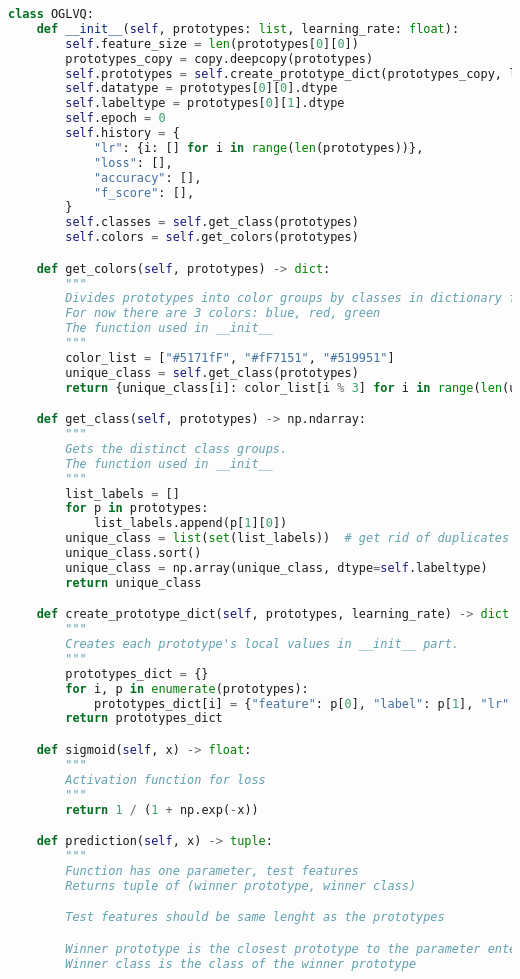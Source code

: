 \begin{lstlisting}[language = python]
class OGLVQ:
    def __init__(self, prototypes: list, learning_rate: float):
        self.feature_size = len(prototypes[0][0])
        prototypes_copy = copy.deepcopy(prototypes)
        self.prototypes = self.create_prototype_dict(prototypes_copy, learning_rate)
        self.datatype = prototypes[0][0].dtype
        self.labeltype = prototypes[0][1].dtype
        self.epoch = 0
        self.history = {
            "lr": {i: [] for i in range(len(prototypes))},
            "loss": [],
            "accuracy": [],
            "f_score": [],
        }
        self.classes = self.get_class(prototypes)
        self.colors = self.get_colors(prototypes)

    def get_colors(self, prototypes) -> dict:
        """
        Divides prototypes into color groups by classes in dictionary form
        For now there are 3 colors: blue, red, green
        The function used in __init__
        """
        color_list = ["#5171fF", "#fF7151", "#519951"]
        unique_class = self.get_class(prototypes)
        return {unique_class[i]: color_list[i % 3] for i in range(len(unique_class))}

    def get_class(self, prototypes) -> np.ndarray:
        """
        Gets the distinct class groups.
        The function used in __init__
        """
        list_labels = []
        for p in prototypes:
            list_labels.append(p[1][0])
        unique_class = list(set(list_labels))  # get rid of duplicates
        unique_class.sort()
        unique_class = np.array(unique_class, dtype=self.labeltype)
        return unique_class

    def create_prototype_dict(self, prototypes, learning_rate) -> dict:
        """
        Creates each prototype's local values in __init__ part.
        """
        prototypes_dict = {}
        for i, p in enumerate(prototypes):
            prototypes_dict[i] = {"feature": p[0], "label": p[1], "lr": learning_rate}
        return prototypes_dict

    def sigmoid(self, x) -> float:
        """
        Activation function for loss
        """
        return 1 / (1 + np.exp(-x))

    def prediction(self, x) -> tuple:
        """
        Function has one parameter, test features
        Returns tuple of (winner prototype, winner class)

        Test features should be same lenght as the prototypes

        Winner prototype is the closest prototype to the parameter entered
        Winner class is the class of the winner prototype


\end{lstlisting}
